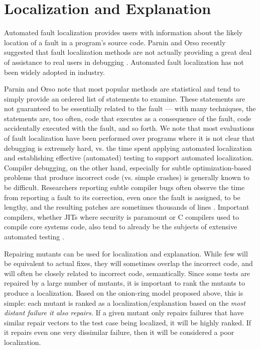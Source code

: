 \section{Localization and Explanation}

Automated fault localization \cite{FaultSurvey,Jones2002} provides users with
information about the likely location of a fault in a program's source
code.    Parnin and Orso recently
suggested that fault localization methods are not actually providing a
great deal of assistance to real users in debugging \cite{AutoHelp}.
Automated fault localization has not been widely adopted in industry.

Parnin and Orso note that most popular methods are
statistical and tend to simply provide an ordered list of statements
to examine.  These statements are not guaranteed to be essentially
related to the fault --- with many techniques, the statements are,
too often, code that executes as a consequence of the fault, code
accidentally executed with the fault, and so forth.  We note that most
evaluations of fault localization have been performed over programs
where it is not clear that debugging is extremely hard, vs. the time
spent applying automated localization and establishing effective
(automated) testing to support automated localization.  Compiler
debugging, on the other hand, especially for subtle optimization-based
problems that produce incorrect code (vs. simple crashes) is generally
known to be difficult.
Researchers reporting subtle compiler bugs often observe the time from
reporting a fault to its correction, even once the fault is assigned,
to be lengthy, and the resulting patches are sometimes thousands of
lines \cite{PLDI13}.  Important compilers, whether JITs where security is paramount
or C compilers used to compile core systems code, also tend to already
be the
subjects of extensive automated testing \cite{jsfunfuzz,csmith}.



Repairing mutants can be used for localization and
explanation.  While few will be equivalent to actual fixes, they
will sometimes overlap the incorrect code, and will often be closely
related to incorrect code, semantically.  Since some tests are
repaired by a large number of mutants, it is important to rank the
mutants to produce a localization.  Based on the onion-ring model proposed above, this is simple: each mutant is ranked as
a localization/explanation based on the \emph{most distant failure it also
  repairs.}  If a given mutant only repairs failures that have similar
repair vectors to the test case being localized, it will be highly
ranked.  If it repairs even one very dissimilar failure, then it will
be considered a poor localization.

